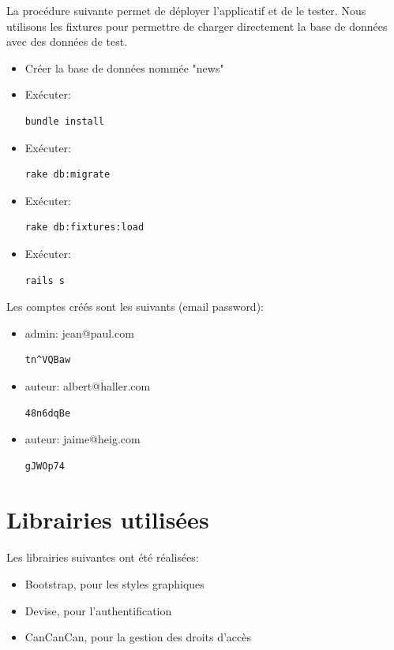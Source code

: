 \documentclass{article}
\begin{document}
La procédure suivante permet de déployer l'applicatif et de le tester. Nous utilisons les fixtures pour permettre de charger directement la base de données avec des données de test.

\begin{itemize}
\item Créer la base de données nommée "news"
\item Exécuter: \begin{verbatim}bundle install\end{verbatim}
\item Exécuter: \begin{verbatim}rake db:migrate\end{verbatim}
\item Exécuter: \begin{verbatim}rake db:fixtures:load\end{verbatim}
\item Exécuter: \begin{verbatim}rails s\end{verbatim}
\end{itemize}

Les comptes créés sont les suivants (email password):

\begin{itemize}
\item admin: jean@paul.com \begin{verbatim}tn^VQBaw\end{verbatim}
\item auteur: albert@haller.com \begin{verbatim}48n6dqBe\end{verbatim}
\item auteur: jaime@heig.com \begin{verbatim}gJWOp74\end{verbatim}
\end{itemize}

\section{Librairies utilisées}

Les librairies suivantes ont été réalisées:

\begin{itemize}
\item Bootstrap, pour les styles graphiques
\item Devise, pour l'authentification
\item CanCanCan, pour la gestion des droits d'accès
\end{itemize}
\end{document}
